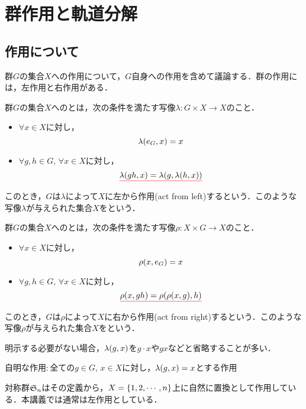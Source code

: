 \documentclass[main]{subfiles}
\begin{document}
\section{群作用と軌道分解}
	\subsection{作用について}
		群$G$の集合$X$への作用について，$G$自身への作用を含めて議論する．群の作用には，左作用と右作用がある．
		\begin{dfn}
			群$G$の集合$X$へのとは，次の条件を満たす写像$\lambda:G\times X\to X$のこと．
			\begin{itemize}
				\item $\forall x\in X$に対し，
					\[\lambda\qty(e_G,x)=x\]
				\item $\forall g,h\in G,\,\forall x\in X$に対し，
					\[{\color{red} \underline{{\color{black} \lambda\qty(gh,x)=\lambda\qty(g,\lambda\qty(h,x))}}}\]
			\end{itemize}
			このとき，$G$は$\lambda$によって$X$に左から作用(act from left)するという．このような写像$\lambda$が与えられた集合$X$をという．
		\end{dfn}
		\begin{dfn}
			群$G$の集合$X$へのとは，次の条件を満たす写像$\rho:X\times G\to X$のこと．
			\begin{itemize}
				\item $\forall x\in X$に対し，
					\[\rho\qty(x,e_G)=x\]
				\item $\forall g,h\in G,\,\forall x\in X$に対し，
					\[{\color{red} \underline{{\color{black} \rho\qty(x,gh)=\rho\qty(\rho\qty(x,g),h)}}}\]
			\end{itemize}
			このとき，$G$は$\rho$によって$X$に右から作用(act from right)するという．このような写像$\rho$が与えられた集合$X$を\redunderline{右$G$集合(right $G$-set)}という．
		\end{dfn}
		\begin{remark*}
			明示する必要がない場合，$\lambda\qty(g,x)$を$g\cdot x$や$gx$などと省略することが多い．
		\end{remark*}
		\begin{note*}
			自明な作用:\,全ての$g\in G,\,x\in X$に対し，$\lambda\qty(g,x)=x$とする作用
		\end{note*}
		\begin{note*}
			対称群$\mathfrak{S}_n$はその定義から，$X=\qty{1,2,\cdots,n}$上に自然に置換として作用している．本講義では通常は左作用としている．
		\end{note*}
\end{document}
